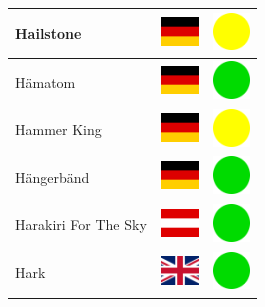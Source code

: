 \documentclass[12pt, a4paper, twoside]{report}
\begin{document}
\begin{center}
\begin{longtable}{|p{5cm}|p{2cm}|p{2cm}|}
			Hailstone & \includegraphics[width=1cm]{4x3/de} & \includegraphics[width=1cm]{likes/m} \\ \hline
			Hämatom & \includegraphics[width=1cm]{4x3/de} & \includegraphics[width=1cm]{likes/y} \\ \hline
			Hammer King & \includegraphics[width=1cm]{4x3/de} & \includegraphics[width=1cm]{likes/m} \\ \hline
			Hängerbänd & \includegraphics[width=1cm]{4x3/de} & \includegraphics[width=1cm]{likes/y} \\ \hline
			Harakiri For The Sky & \includegraphics[width=1cm]{4x3/at} & \includegraphics[width=1cm]{likes/y} \\ \hline
			Hark & \includegraphics[width=1cm]{4x3/gb} & \includegraphics[width=1cm]{likes/y} \\ \hline

\end{longtable}
\end{center}
\end{document}

